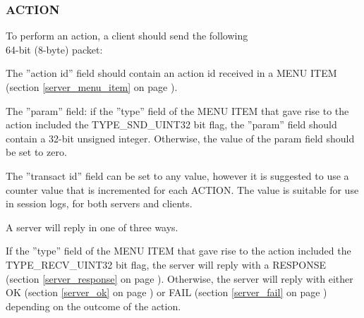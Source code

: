 \documentclass[a4paper,11pt]{article}
\begin{document}
\subsubsection{ACTION}
\label{action}
\hfill\begin{minipage}{\dimexpr\textwidth-1.4cm}
To perform an action, a client should send the following \\
64-bit (8-byte) packet:

\vspace{0.2cm}


\vspace{0.5cm}

The ''action id'' field should contain an action id received
in a MENU ITEM (section \ref{server_menu_item} on page \pageref{server_menu_item}).

\vspace{0.3cm}

The ''param'' field: if the ''type'' field of the MENU ITEM that gave rise to the action
included the TYPE\_SND\_UINT32 bit flag, the ''param'' field should
contain a 32-bit unsigned integer. Otherwise, the value of the param
field should be set to zero.

\vspace{0.3cm}

The ''transact id'' field can be set to any value, however it is suggested to use
a counter value that is incremented for each ACTION. The value is suitable for use
in session logs, for both servers and clients.

\vspace{0.3cm}

A server will reply in one of three ways.

\vspace{0.3cm}

If the ''type'' field of the MENU ITEM that gave rise to the action
included the TYPE\_RECV\_UINT32 bit flag, the server will reply with
a RESPONSE (section \ref{server_response} on page \pageref{server_response}).
Otherwise, the server will reply with either OK (section \ref{server_ok} on page \pageref{server_ok})
or FAIL (section \ref{server_fail} on page \pageref{server_fail}) depending
on the outcome of the action.


\end{minipage}
\end{document}
